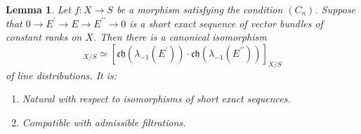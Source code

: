 \documentclass[JEP,XML,SOM,Unicode,published]{cedram}
\theoremstyle{plain}
\newtheorem{lemma}[theorem]{Lemma}
\theoremstyle{definition}
\newcommand{\chfrak}{\mathfrak {ch}}
\newcommand{\bis}{\prime\prime}
\begin{document}
\begin{lemma}\label{lemma:lambda-1mult}
Let $f\colon X\to S$ be a morphism satisfying the condition $(C_{n})$. Suppose that $0 \to E^{\prime} \to E \to E^{\bis}\to 0 $ is a short exact sequence of vector bundles of constant ranks on $X$. Then there is a canonical isomorphism
\begin{displaymath}
[ \chfrak(\lambda_{-1}(E)) ]_{X/S} \simeq [ \chfrak(\lambda_{-1}(E^{\prime})) \cdot \chfrak(\lambda_{-1}(E^{\bis})) ]_{X/S}
\end{displaymath}
of line distributions. It is:
\begin{enumerate}
\item Natural with respect to isomorphisms of short exact sequences.
\item Compatible with admissible filtrations.
\end{enumerate}
\end{lemma}
\end{document}
